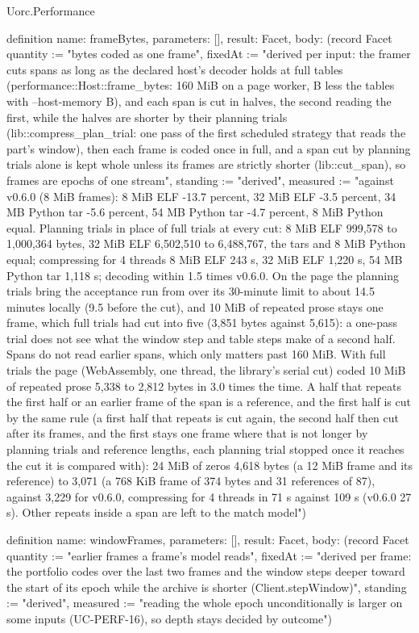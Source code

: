\begin{lexlean}{Uorc.Performance}
\begin{semanticmodule}
definition{
  name: frameBytes,
  parameters: [],
  result: Facet,
  body: (record Facet {quantity := "bytes coded as one frame", fixedAt := "derived per input: the framer cuts spans as long as the declared host's decoder holds at full tables (performance::Host::frame_bytes: 160 MiB on a page worker, B less the tables with --host-memory B), and each span is cut in halves, the second reading the first, while the halves are shorter by their planning trials (lib::compress_plan_trial: one pass of the first scheduled strategy that reads the part's window), then each frame is coded once in full, and a span cut by planning trials alone is kept whole unless its frames are strictly shorter (lib::cut_span), so frames are epochs of one stream", standing := "derived", measured := "against v0.6.0 (8 MiB frames): 8 MiB ELF -13.7 percent, 32 MiB ELF -3.5 percent, 34 MB Python tar -5.6 percent, 54 MB Python tar -4.7 percent, 8 MiB Python equal. Planning trials in place of full trials at every cut: 8 MiB ELF 999,578 to 1,000,364 bytes, 32 MiB ELF 6,502,510 to 6,488,767, the tars and 8 MiB Python equal; compressing for 4 threads 8 MiB ELF 243 s, 32 MiB ELF 1,220 s, 54 MB Python tar 1,118 s; decoding within 1.5 times v0.6.0. On the page the planning trials bring the acceptance run from over its 30-minute limit to about 14.5 minutes locally (9.5 before the cut), and 10 MiB of repeated prose stays one frame, which full trials had cut into five (3,851 bytes against 5,615): a one-pass trial does not see what the window step and table steps make of a second half. Spans do not read earlier spans, which only matters past 160 MiB. With full trials the page (WebAssembly, one thread, the library's serial cut) coded 10 MiB of repeated prose 5,338 to 2,812 bytes in 3.0 times the time. A half that repeats the first half or an earlier frame of the span is a reference, and the first half is cut by the same rule (a first half that repeats is cut again, the second half then cut after its frames, and the first stays one frame where that is not longer by planning trials and reference lengths, each planning trial stopped once it reaches the cut it is compared with): 24 MiB of zeros 4,618 bytes (a 12 MiB frame and its reference) to 3,071 (a 768 KiB frame of 374 bytes and 31 references of 87), against 3,229 for v0.6.0, compressing for 4 threads in 71 s against 109 s (v0.6.0 27 s). Other repeats inside a span are left to the match model"})
}

definition{
  name: windowFrames,
  parameters: [],
  result: Facet,
  body: (record Facet {quantity := "earlier frames a frame's model reads", fixedAt := "derived per frame: the portfolio codes over the last two frames and the window steps deeper toward the start of its epoch while the archive is shorter (Client.stepWindow)", standing := "derived", measured := "reading the whole epoch unconditionally is larger on some inputs (UC-PERF-16), so depth stays decided by outcome"})
}


\end{semanticmodule}
\end{lexlean}

